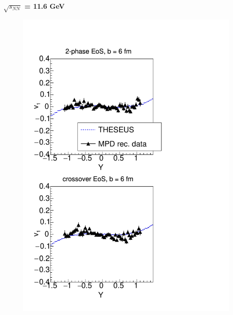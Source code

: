 \documentclass[dvipsnames] {beamer}
\begin{document}
\begin{frame}[shrink=5]
\begin{columns}[c]
\begin{block}{\bf \centering $\sqrt{s_{NN}}$ = 11.6 GeV}
\begin{figure}[H]
      \includegraphics[width=1.\textwidth]{energy70AGeV_proton_urqON.pdf}
        \end{figure}     
     \end{block}
    
   \end{columns}
 \end{frame}
\end{document}
